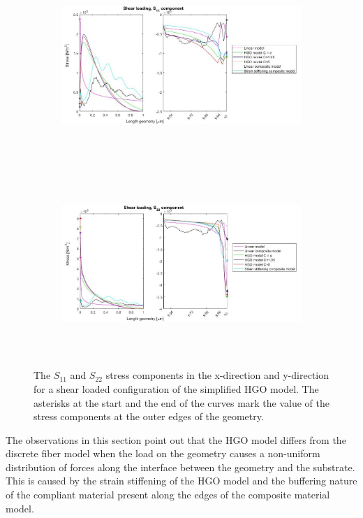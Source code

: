 \begin{figure}[h!]
    \begin{subfigure}{0.95\textwidth}
    \includegraphics[width=\textwidth, height=7cm, angle=0]{images/HGO_model_validation/HGO_model_shear_S11.jpg}
    \caption{}
    \label{fig:HGO_shear_S11}
    \end{subfigure}
    \hfill
    \begin{subfigure}{0.95\textwidth}
    \includegraphics[width=\textwidth, height=7cm, angle=0]{images/HGO_model_validation/HGO_model_shear_S22.jpg}
    \caption{}
    \label{fig:HGO_shear_S22}
    \end{subfigure}
    \caption{The $S_{11}$ and $S_{22}$ stress components in the x-direction and y-direction for a shear loaded configuration of the simplified HGO model. The asterisks at the start and the end of the curves mark the value of the stress components at the outer edges of the geometry.}
    \label{fig:HGO_validation_2}
\end{figure}

\qquad The observations in this section point out that the HGO model differs from the discrete fiber model when the load on the geometry causes a non-uniform distribution of forces along the interface between the geometry and the substrate. This is caused by the strain stiffening of the HGO model and the buffering nature of the compliant material present along the edges of the composite material model.\\ 

